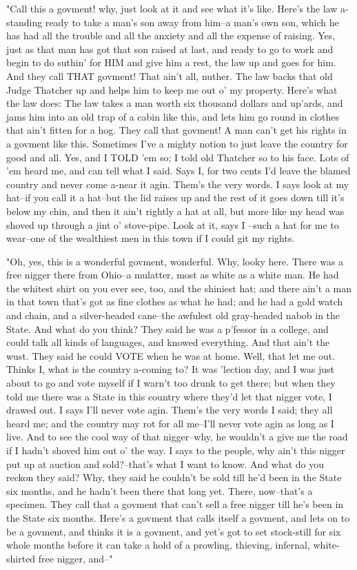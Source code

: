 "Call this a govment! why, just look at it and see what it's like.
Here's the law a-standing ready to take a man's son away from him--a
man's own son, which he has had all the trouble and all the anxiety and
all the expense of raising.  Yes, just as that man has got that son
raised at last, and ready to go to work and begin to do suthin' for HIM
and give him a rest, the law up and goes for him.  And they call THAT
govment!  That ain't all, nuther.  The law backs that old Judge Thatcher
up and helps him to keep me out o' my property.  Here's what the law
does:  The law takes a man worth six thousand dollars and up'ards, and
jams him into an old trap of a cabin like this, and lets him go round in
clothes that ain't fitten for a hog. They call that govment!  A man can't
get his rights in a govment like this. Sometimes I've a mighty notion to
just leave the country for good and all. Yes, and I TOLD 'em so; I told
old Thatcher so to his face.  Lots of 'em heard me, and can tell what I
said.  Says I, for two cents I'd leave the blamed country and never come
a-near it agin.  Them's the very words.  I says look at my hat--if you
call it a hat--but the lid raises up and the rest of it goes down till
it's below my chin, and then it ain't rightly a hat at all, but more like
my head was shoved up through a jint o' stove-pipe.  Look at it, says I
--such a hat for me to wear--one of the wealthiest men in this town if I
could git my rights.

"Oh, yes, this is a wonderful govment, wonderful.  Why, looky here.
There was a free nigger there from Ohio--a mulatter, most as white as a
white man.  He had the whitest shirt on you ever see, too, and the
shiniest hat; and there ain't a man in that town that's got as fine
clothes as what he had; and he had a gold watch and chain, and a
silver-headed cane--the awfulest old gray-headed nabob in the State.  And
what do you think?  They said he was a p'fessor in a college, and could
talk all kinds of languages, and knowed everything.  And that ain't the
wust. They said he could VOTE when he was at home.  Well, that let me
out. Thinks I, what is the country a-coming to?  It was 'lection day, and
I was just about to go and vote myself if I warn't too drunk to get
there; but when they told me there was a State in this country where
they'd let that nigger vote, I drawed out.  I says I'll never vote agin.
Them's the very words I said; they all heard me; and the country may rot
for all me--I'll never vote agin as long as I live.  And to see the cool
way of that nigger--why, he wouldn't a give me the road if I hadn't
shoved him out o' the way.  I says to the people, why ain't this nigger
put up at auction and sold?--that's what I want to know.  And what do you
reckon they said? Why, they said he couldn't be sold till he'd been in
the State six months, and he hadn't been there that long yet.  There,
now--that's a specimen.  They call that a govment that can't sell a free
nigger till he's been in the State six months.  Here's a govment that
calls itself a govment, and lets on to be a govment, and thinks it is a
govment, and yet's got to set stock-still for six whole months before it
can take a hold of a prowling, thieving, infernal, white-shirted free
nigger, and--"

